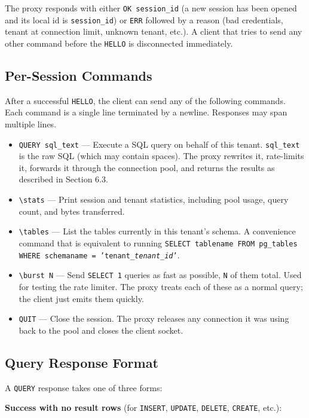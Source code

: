 \documentclass[11pt,a4paper]{article}
\begin{document}
The proxy responds with either \texttt{OK session\_id} (a new session has been opened and its local id is \texttt{session\_id}) or \texttt{ERR} followed by a reason (bad credentials, tenant at connection limit, unknown tenant, etc.). A client that tries to send any other command before the \texttt{HELLO} is disconnected immediately.

\subsection{Per-Session Commands}
After a successful \texttt{HELLO}, the client can send any of the following commands. Each command is a single line terminated by a newline. Responses may span multiple lines.

\begin{itemize}
\item \texttt{QUERY sql\_text} --- Execute a SQL query on behalf of this tenant. \texttt{sql\_text} is the raw SQL (which may contain spaces). The proxy rewrites it, rate-limits it, forwards it through the connection pool, and returns the results as described in Section 6.3.

\item \verb|\stats| --- Print session and tenant statistics, including pool usage, query count, and bytes transferred.

\item \verb|\tables| --- List the tables currently in this tenant's schema. A convenience command that is equivalent to running \texttt{SELECT tablename FROM pg\_tables WHERE schemaname = 'tenant\_\textit{tenant\_id}'}.

\item \verb|\burst N| --- Send \texttt{SELECT 1} queries as fast as possible, \texttt{N} of them total. Used for testing the rate limiter. The proxy treats each of these as a normal query; the client just emits them quickly.

\item \texttt{QUIT} --- Close the session. The proxy releases any connection it was using back to the pool and closes the client socket.
\end{itemize}

\subsection{Query Response Format}
A \texttt{QUERY} response takes one of three forms:

\textbf{Success with no result rows} (for \texttt{INSERT}, \texttt{UPDATE}, \texttt{DELETE}, \texttt{CREATE}, etc.):
\end{document}
